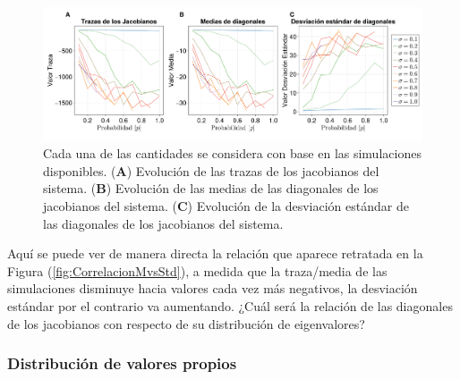 \documentclass[a4paper,11pt]{book}
\theoremstyle{plain}
\theoremstyle{definition}
\begin{document}
\begin{figure}[h!]
	\centering
	\includegraphics[scale=0.15]{../Imagenes/TrMedStd}
	\caption{Cada una de las cantidades se considera con base en las simulaciones disponibles. (\textbf{A}) Evolución de las trazas de los jacobianos del sistema. (\textbf{B}) Evolución de las medias de las diagonales de los jacobianos del sistema. (\textbf{C}) Evolución de la desviación estándar de las diagonales de los jacobianos del sistema.}
	\label{fig:TrMedStd}
\end{figure}

Aquí se puede ver de manera directa la relación que aparece retratada en la Figura (\ref{fig:CorrelacionMvsStd}), a medida que la traza/media de las simulaciones disminuye hacia valores cada vez más negativos, la desviación estándar por el contrario va aumentando. ¿Cuál será la relación de las diagonales de los jacobianos con respecto de su distribución de eigenvalores?

\subsubsection*{Distribución de valores propios}
\end{document}

